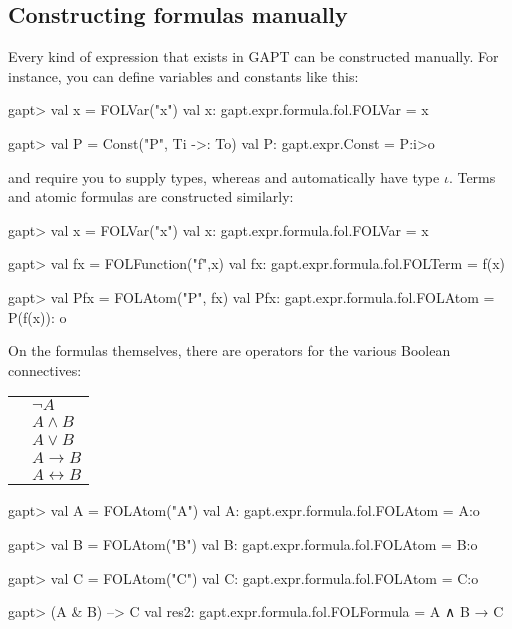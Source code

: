\documentclass[a4paper,11pt]{book}
\newcommand{\impl}{\to} %
\newcommand{\cli}[1]{{\ttfamily {#1}}}
\begin{document}
\subsection{Constructing formulas manually}
Every kind of expression that exists in GAPT can be constructed manually. For instance, you can define variables
and constants like this:
\begin{clilisting}
gapt> val x = FOLVar("x")
val x: gapt.expr.formula.fol.FOLVar = x

gapt> val P = Const("P", Ti ->: To)
val P: gapt.expr.Const = P:i>o

\end{clilisting}
\cli{Var} and \cli{Const} require you to supply types, whereas \cli{FOLVar} and
\cli{FOLConst} automatically have type $\iota$. Terms and atomic formulas are constructed
similarly:
\begin{clilisting}
gapt> val x = FOLVar("x")
val x: gapt.expr.formula.fol.FOLVar = x

gapt> val fx = FOLFunction("f",x)
val fx: gapt.expr.formula.fol.FOLTerm = f(x)

gapt> val Pfx = FOLAtom("P", fx)
val Pfx: gapt.expr.formula.fol.FOLAtom = P(f(x)): o

\end{clilisting}

On the formulas themselves, there are operators for the various Boolean connectives:

\begin{tabular}{r l}
  \cli{-A}      & $\neg A$              \\
  \cli{A \& B}  & $A \wedge B$          \\
  \cli{A | B}   & $A \vee B$            \\
  \cli{A --> B} & $A \impl B$           \\
  \cli{A <-> B} & $A \leftrightarrow B$
\end{tabular}

\begin{clilisting}
gapt> val A = FOLAtom("A")
val A: gapt.expr.formula.fol.FOLAtom = A:o

gapt> val B = FOLAtom("B")
val B: gapt.expr.formula.fol.FOLAtom = B:o

gapt> val C = FOLAtom("C")
val C: gapt.expr.formula.fol.FOLAtom = C:o

gapt> (A & B) --> C
val res2: gapt.expr.formula.fol.FOLFormula = A ∧ B → C

\end{clilisting}
\end{document}
